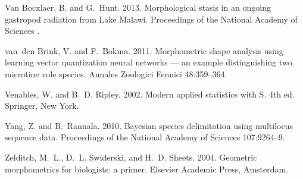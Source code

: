 \documentclass[12pt,letterpaper]{article}
\begin{document}
\begin{thebibliography}{77}
        {Van Bocxlaer}, B. and G.~Hunt. 2013. {Morphological stasis in an ongoing
        gastropod radiation from Lake Malawi}. Proceedings of the National Academy of
        Sciences .

        van~den Brink, V. and F.~Bokma. 2011. {Morphometric shape analysis using
          learning vector quantization neural networks — an example distinguishing
        two microtine vole species}. Annales Zoologici Fennici 48:359--364.

        Venables, W. and B.~D. Ripley. 2002. {Modern applied statistics with S}. 4th
        ed. Springer, New York.

        Yang, Z. and B.~Rannala. 2010. {Bayesian species delimitation using multilocus
        sequence data.} Proceedings of the National Academy of Sciences 107:9264--9.

        Zelditch, M.~L., D.~L. Swiderski, and H.~D. Sheets. 2004. {Geometric
        morphometrics for biologists: a primer}. Elsevier Academic Press, Amsterdam.

    \end{thebibliography}
\end{document}
